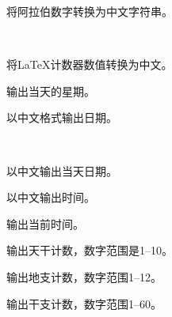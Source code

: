 
将阿拉伯数字转换为中文字符串。
\begin{codeshow}
\\
\end{codeshow}

将\LaTeX 计数器数值转换为中文。

\begin{latex}
\end{latex}

输出当天的星期。

\begin{codeshow}
\end{codeshow}

以中文格式输出日期。

\begin{codeshow}
\\
\end{codeshow}

以中文输出当天日期。

\begin{codeshow}
\zhtoday
\end{codeshow}

以中文输出时间。

\begin{codeshow}
\end{codeshow}

输出当前时间。

\begin{codeshow}
\zhcurrtime
\end{codeshow}

输出天干计数，数字范围是1--10。

\begin{codeshow}
 
 
 
\end{codeshow}

输出地支计数，数字范围1--12。

\begin{codeshow}
  
  
\end{codeshow}

输出干支计数，数字范围1--60。

\begin{codeshow}
 
\\ 
 
\end{codeshow}

